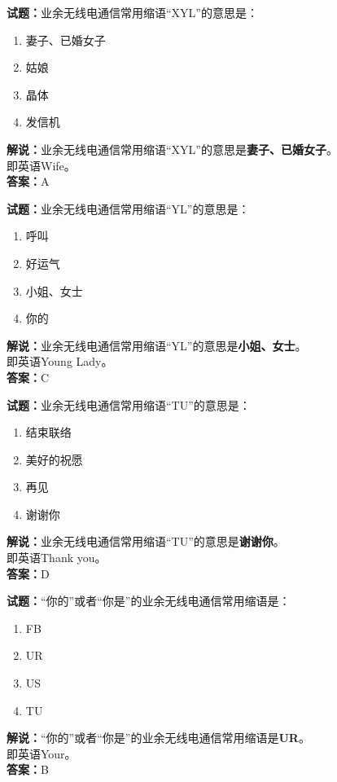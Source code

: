 \documentclass{ctexbook}
\begin{document}
\bigskip


\noindent\textbf{试题：}业余无线电通信常用缩语“XYL”的意思是：
\begin{enumerate}[leftmargin=3em]
\item 妻子、已婚女子
\item 姑娘
\item 晶体
\item 发信机
\end{enumerate}
\noindent\textbf{解说：}业余无线电通信常用缩语“XYL”的意思是\textbf{妻子、已婚女子}。\\即英语Wife。\\\noindent\textbf{答案：}A



\bigskip


\noindent\textbf{试题：}业余无线电通信常用缩语“YL”的意思是：
\begin{enumerate}[leftmargin=3em]
\item 呼叫
\item 好运气
\item 小姐、女士
\item 你的
\end{enumerate}
\noindent\textbf{解说：}业余无线电通信常用缩语“YL”的意思是\textbf{小姐、女士}。\\即英语Young Lady。\\\noindent\textbf{答案：}C




\bigskip


\noindent\textbf{试题：}业余无线电通信常用缩语“TU”的意思是：
\begin{enumerate}[leftmargin=3em]
\item 结束联络
\item 美好的祝愿
\item 再见
\item 谢谢你
\end{enumerate}
\noindent\textbf{解说：}业余无线电通信常用缩语“TU”的意思是\textbf{谢谢你}。\\即英语Thank you。\\\noindent\textbf{答案：}D



\bigskip


\noindent\textbf{试题：}“你的”或者“你是”的业余无线电通信常用缩语是：
\begin{enumerate}[leftmargin=3em]
\item FB
\item UR
\item US
\item TU
\end{enumerate}
\noindent\textbf{解说：}“你的”或者“你是”的业余无线电通信常用缩语是\textbf{UR}。\\即英语Your。\\\noindent\textbf{答案：}B
\end{document}
